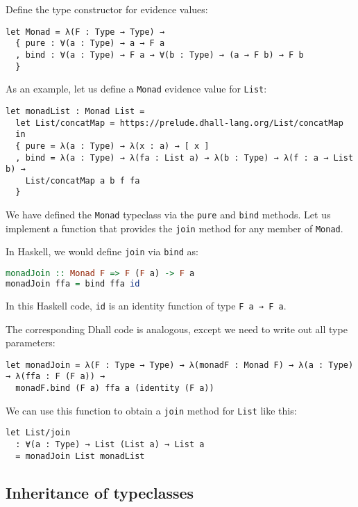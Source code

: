 Define the type constructor for evidence values:


\begin{lstlisting}[language=Dhall]
let Monad = λ(F : Type → Type) →
  { pure : ∀(a : Type) → a → F a
  , bind : ∀(a : Type) → F a → ∀(b : Type) → (a → F b) → F b
  }
\end{lstlisting}


As an example, let us define a \lstinline!Monad! evidence value for \lstinline!List!:


\begin{lstlisting}[language=Dhall]
let monadList : Monad List =
  let List/concatMap = https://prelude.dhall-lang.org/List/concatMap
  in
  { pure = λ(a : Type) → λ(x : a) → [ x ]
  , bind = λ(a : Type) → λ(fa : List a) → λ(b : Type) → λ(f : a → List b) →
    List/concatMap a b f fa
  }
\end{lstlisting}


We have defined the \lstinline!Monad! typeclass via the \lstinline!pure! and \lstinline!bind! methods.
Let us implement a function that provides the \lstinline!join! method for any member of \lstinline!Monad!.


In Haskell, we would define \lstinline!join! via \lstinline!bind! as:


\begin{lstlisting}[language=Haskell]
monadJoin :: Monad F => F (F a) -> F a
monadJoin ffa = bind ffa id
\end{lstlisting}


In this Haskell code, \lstinline!id! is an identity function of type \lstinline!F a → F a!.


The corresponding Dhall code is analogous, except we need to write out all type parameters:


\begin{lstlisting}[language=Dhall]
let monadJoin = λ(F : Type → Type) → λ(monadF : Monad F) → λ(a : Type) → λ(ffa : F (F a)) →
  monadF.bind (F a) ffa a (identity (F a))  
\end{lstlisting}


We can use this function to obtain a \lstinline!join! method for \lstinline!List! like this:


\begin{lstlisting}[language=Dhall]
let List/join
  : ∀(a : Type) → List (List a) → List a
  = monadJoin List monadList 
\end{lstlisting}


\subsection{Inheritance of typeclasses}


